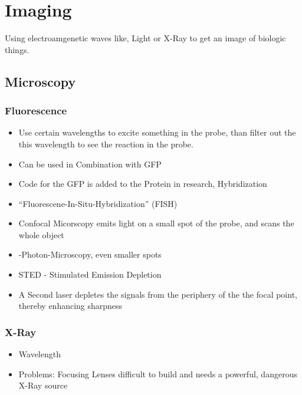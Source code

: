 \section{Imaging}


Using electroamgenetic waves like, Light or X-Ray to
get an image of biologic things.

\subsection{Microscopy}

\subsubsection*{Fluorescence}
\begin{itemize}
	\item Use certain wavelengths to excite something in the probe,
			than filter out the this wavelength to see the reaction in the probe.
	\item Can be used in Combination with GFP
	\item Code for the GFP is added to the Protein in research, Hybridization
	\item ``Fluorescene-In-Situ-Hybridization'' (FISH)
	\item Confocal Micorscopy emits light on a small spot of the probe,
			and scans the whole object
	\item {}-Photon-Microscopy, even smaller spots
	\item STED - Stimulated Emission Depletion
	\item \textrightarrow A Second laser depletes the signals from the
		periphery of the the focal point, thereby enhancing sharpness
\end{itemize}

\subsubsection*{X-Ray}

\begin{itemize}
	\item Wavelength
	\item Problems: Focusing Lenses difficult to build and needs a powerful, dangerous X-Ray source
\end{itemize}
